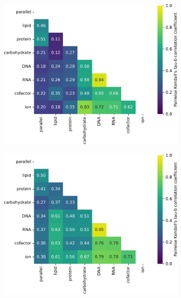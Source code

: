 \begin{figure}
  \centering
  \begin{subfigure}[t]{0.45\textwidth}
  \centering
    \includegraphics[width=\linewidth]{CompareEnzUse_glc16p89_pyrUnres_ammUnres_2.pdf}
    \caption{
    }
    \label{fig:model-rank-glc-lowratio-kendall}
  \end{subfigure}%
  \begin{subfigure}[t]{0.45\textwidth}
  \centering
    \includegraphics[width=\linewidth]{CompareEnzUse_glc01p69_pyrUnres_amm01p05_2.pdf}
    \caption{
    }
    \label{fig:model-rank-glc-highratio-kendall}
  \end{subfigure}


\end{figure}
